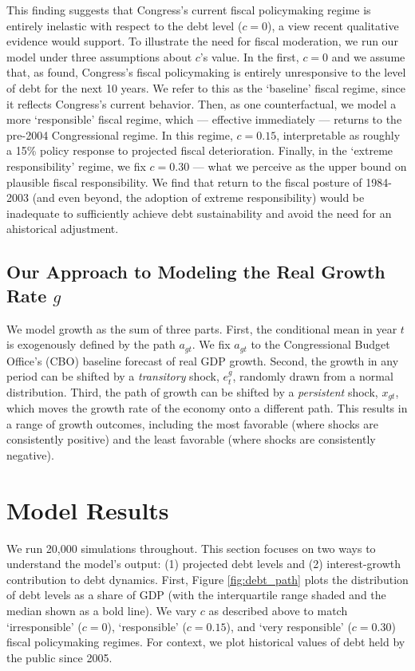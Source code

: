 \documentclass[12pt]{article}
\begin{document}
This finding suggests that Congress's current fiscal policymaking regime is entirely inelastic with respect to the debt level ($c = 0$), a view recent qualitative evidence would support. To illustrate the need for fiscal moderation, we run our model under three assumptions about $c$'s value. In the first, $c = 0$ and we assume that, as \textcite{auerbach2025robust} found, Congress's fiscal policymaking is entirely unresponsive to the level of debt for the next 10 years. We refer to this as the `baseline' fiscal regime, since it reflects Congress's current behavior. Then, as one counterfactual, we model a more `responsible' fiscal regime, which --- effective immediately --- returns to the pre-2004 Congressional regime. In this regime, $c = 0.15$, interpretable as roughly a 15\% policy response to projected fiscal deterioration. Finally, in the `extreme responsibility' regime, we fix $c = 0.30$ --- what we perceive as the upper bound on plausible fiscal responsibility. We find that return to the fiscal posture of 1984-2003 (and even beyond, the adoption of extreme responsibility) would be inadequate to sufficiently achieve debt sustainability and avoid the need for an ahistorical adjustment.

\subsection{Our Approach to Modeling the Real Growth Rate $g$}

We model growth as the sum of three parts. First, the conditional mean in year $t$ is exogenously defined by the path $a_{gt}$. We fix $a_{gt}$ to the Congressional Budget Office's (CBO) baseline forecast of real GDP growth. Second, the growth in any period can be shifted by a \textit{transitory} shock, $e^g_t$, randomly drawn from a normal distribution. Third, the path of growth can be shifted by a \textit{persistent} shock, $x_{gt}$, which moves the growth rate of the economy onto a different path. This results in a range of growth outcomes, including the most favorable (where shocks are consistently positive) and the least favorable (where shocks are consistently negative).

\section{Model Results}

We run 20,000 simulations throughout. This section focuses on two ways to understand the model's output: (1) projected debt levels and (2) interest-growth contribution to debt dynamics. First, Figure \ref{fig:debt_path} plots the distribution of debt levels as a share of GDP (with the interquartile range shaded and the median shown as a bold line). We vary $c$ as described above to match `irresponsible' ($c=0$), `responsible' ($c=0.15$), and `very responsible' ($c=0.30$) fiscal policymaking regimes. For context, we plot historical values of debt held by the public since 2005.
\end{document}
